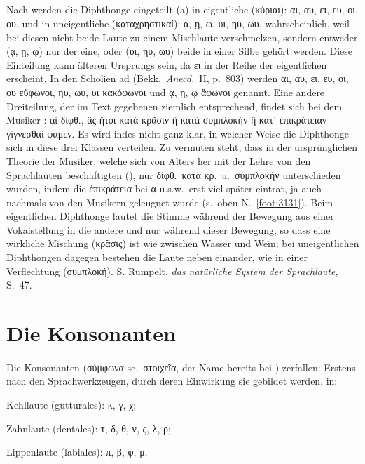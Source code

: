 \setcounter{subparagraph}{4}
{\small
	\noindent\subparagraph{} Nach  werden die Diphthonge eingeteilt (a) in eigentliche (κύριαι): αι, αυ, ει,
	ευ, οι, ου, und in uneigentliche (καταχρηστικαί): ᾳ, ῃ, ῳ, υι, ηυ, ωυ,
	wahrscheinlich, weil bei diesen nicht beide Laute zu einem Mischlaute
	verschmelzen, sondern entweder (ᾳ, ῃ, ῳ) nur der eine, oder (υι, ηυ, ωυ) beide
	in einer Silbe gehört werden.
	Diese Einteilung kann älteren Ursprungs sein, da ει in der Reihe der
	eigentlichen erscheint.
	In den Scholien ad  (Bekk.\ \emph{Anecd.}\ II, p.\ 803) werden
	αι, αυ, ει, ευ, οι, ου εὔφωνοι, ηυ, ωυ, υι κακόφωνοι und ᾳ, ῃ, ῳ ἄφωνοι
	genannt.
	Eine andere Dreiteilung, der im Text gegebenen ziemlich entsprechend, findet
	sich bei dem Musiker \passagem{ArQuintPeriMousike121}:
	αἱ δίφθ., ἃς ἤτοι κατὰ κρᾶσιν ἢ κατὰ συμπλοκὴν ἢ κατʼ ἐπικράτειαν γίγνεσθαί
	φαμεν.
	Es wird indes nicht ganz klar, in welcher Weise die Diphthonge sich in diese
	drei Klassen verteilen.
	Zu vermuten steht, dass in der ursprünglichen Theorie der Musiker, welche sich
	von Alters her mit der Lehre von den Sprachlauten beschäftigten
	(), nur δίφθ.\ κατὰ κρ.\ u.\ συμπλοκήν unterschieden
	wurden, indem die ἐπικράτεια bei ᾳ u.s.w.\ erst viel später eintrat, ja auch
	nachmals von den Musikern geleugnet wurde (s.\ oben
	 N.~\ref{foot:3131}).
	Beim eigentlichen Diphthonge lautet die Stimme während der Bewegung aus einer
	Vokalstellung in die andere und nur während dieser Bewegung, so dass eine
	wirkliche Mischung (κρᾶσις) ist wie zwischen Wasser und Wein; bei uneigentlichen
	Diphthongen dagegen bestehen die Laute neben einander, wie in einer Verflechtung
	(συμπλοκή).
	S. Rumpelt, \emph{das natürliche System der Sprachlaute}, S.\ 47.
}


\section{Die Konsonanten}

\paragraph{} Die Konsonanten (σύμφωνα sc.\ στοιχεῖα, der Name bereits bei
\glsxtrshort{DionysThrax}) zerfallen:
Erstens nach den Sprachwerkzeugen, durch deren Einwirkung sie gebildet werden, in:
\begin{compactitem}
	\item Kehllaute (gutturales): κ, γ, χ;
	\item Zahnlaute (dentales): τ, δ, θ, ν, ς, λ, ρ;
	\item Lippenlaute (labiales): π, β, φ, μ.
\end{compactitem}

